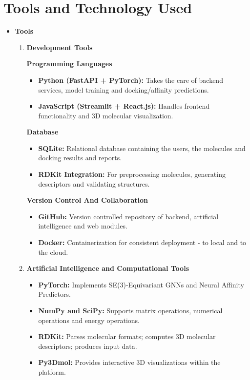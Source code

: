 \documentclass[12pt,a4]{report}
\begin{document}
\section{Tools and Technology Used}

\begin{itemize}
\item \textbf{Tools}
\begin{enumerate}
\item \textbf{Development Tools}

\noindent \textbf{Programming Languages}
\begin{itemize}
    \item \textbf{Python (FastAPI + PyTorch):} Takes the care of backend services, model training and docking/affinity predictions.
    \item \textbf{JavaScript (Streamlit + React.js):} Handles frontend functionality and 3D molecular visualization.
\end{itemize}

\noindent \textbf{Database}
\begin{itemize}
    \item \textbf{SQLite:} Relational database containing the users, the molecules and docking results and reports.
    \item \textbf{RDKit Integration:} For preprocessing molecules, generating descriptors and validating structures.
\end{itemize}

\noindent \textbf{Version Control And Collaboration}
\begin{itemize}
    \item \textbf{GitHub:} Version controlled repository of backend, artificial intelligence and web modules.
    \item \textbf{Docker:} Containerization for consistent deployment - to local and to the cloud.
\end{itemize}

\vspace{0.3cm}
\item \textbf{Artificial Intelligence and Computational Tools}

\begin{itemize}
    \item \textbf{PyTorch:} Implements SE(3)-Equivariant GNNs and Neural Affinity Predictors.
    \item \textbf{NumPy and SciPy:} Supports matrix operations, numerical operations and energy operations.
    \item \textbf{RDKit:} Parses molecular formats; computes 3D molecular descriptors; produces input data.
    \item \textbf{Py3Dmol:} Provides interactive 3D visualizations within the platform.
\end{itemize}


\end{enumerate}
\end{itemize}
\end{document}
